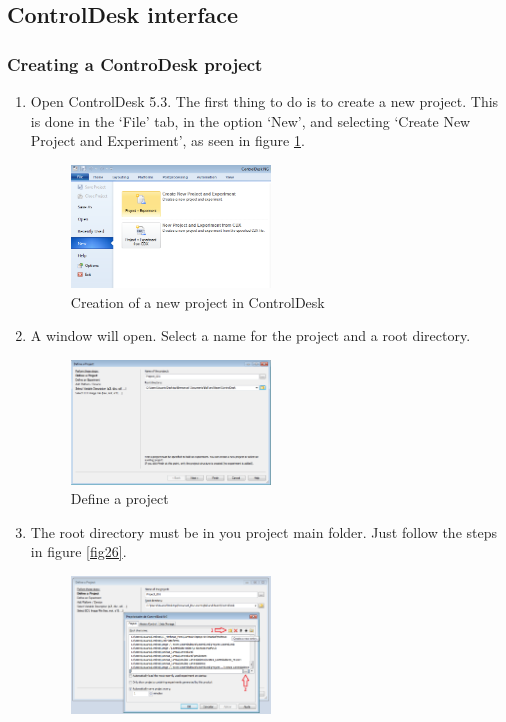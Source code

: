 \subsection{ControlDesk interface}

\subsubsection{Creating a ControDesk project}
\begin{enumerate}
    \item Open ControlDesk 5.3. The first thing to do is to create a new project. This is done in the ‘File’ tab, in the option ‘New’, and selecting ‘Create New Project and Experiment’, as seen in figure \ref{fig24}.
    \begin{figure}[H]
        \centering
        \includegraphics[width=0.5\textwidth]{Images/Ball and Bean/ControlDesk/CD1.png}
        \caption{Creation of a new project in ControlDesk}
        \label{fig24}
    \end{figure}
    \item A window will open. Select a name for the project and a root directory.
    \begin{figure}[H]
        \centering
        \includegraphics[width=0.5\textwidth]{Images/Ball and Bean/ControlDesk/CD2.png}
        \caption{Define a project}
        \label{fig25}
    \end{figure}
    \item The root directory must be in you project main folder. Just follow the steps in figure \ref{fig26}. 
    \begin{figure}[H]
        \centering
        \includegraphics[width=0.5\textwidth]{Images/Ball and Bean/ControlDesk/CD3.png}

\end{figure}
\end{enumerate}
